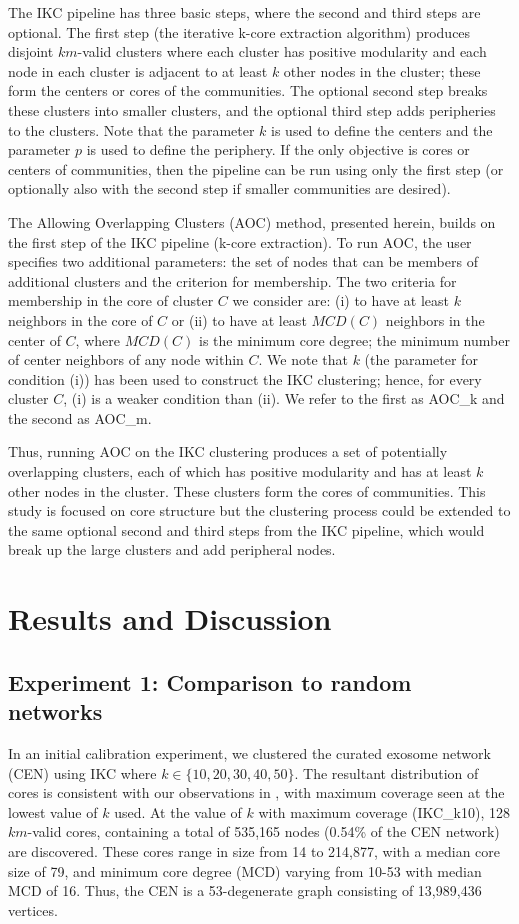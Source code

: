 \documentclass[12pt, oneside]{article}   	%
\begin{document}
The IKC pipeline has three basic steps, where the second and third steps are optional.  The first step (the iterative k-core extraction algorithm) produces disjoint $km$-valid clusters where each cluster has positive modularity and each node in each cluster is adjacent to at least $k$ other nodes in the cluster; these form the centers or cores of the communities. The optional second step breaks these clusters into smaller clusters, and the optional third step adds peripheries to the clusters.  Note that the parameter $k$ is used to define the centers and the parameter $p$ is used to define the periphery. If the only objective is cores or centers of communities, then the pipeline can be run using only the first step (or optionally also with the second step if smaller communities are desired).

The Allowing Overlapping Clusters (AOC) method, presented herein, builds on the first step of the IKC pipeline (k-core extraction). To run AOC, the user specifies two additional parameters:  
the set of nodes that can be members of  additional clusters and the criterion for membership.  The two criteria for membership in the core of cluster $C$ we consider are: (i) to have at least $k$ neighbors 
in the core of $C$ or (ii) to have at least $MCD(C)$ neighbors in the center of $C$, where $MCD(C)$ is the minimum core degree; the minimum number of center neighbors of any node within $C$. 
We note that $k$ (the parameter for condition (i)) has been used to construct the IKC clustering; hence, for every cluster $C$,  (i) is a weaker condition than (ii).
We refer to the first as AOC\_k and the second as AOC\_m.

Thus, running   AOC on the IKC clustering produces a set of potentially overlapping clusters, each of which has positive modularity and has at least $k$ other nodes in the cluster. These clusters form the cores of communities.  This study is focused on core structure but the clustering process could be extended to the same optional second and third steps from the IKC pipeline, which would break up the large clusters and add peripheral nodes. 

\section{Results and Discussion}

\subsection{Experiment 1: Comparison to random networks} In an initial calibration experiment, we clustered the curated exosome network (CEN) using IKC where $k \in {\{10,20,30,40, 50\}}$. The resultant distribution of cores is consistent with our observations in \cite[Figure~3]{Wedell2022}, with maximum coverage seen at the lowest value of $k$ used. At the value of $k$ with maximum coverage (IKC\_k10), 128 $km$-valid cores, containing a total of 535,165 nodes (0.54\% of the CEN network) are discovered. These cores range in size from 14 to 214,877, with a median core size of 79, and minimum core degree (MCD) varying from 10-53 with median MCD of 16. Thus, the CEN is a 53-degenerate graph consisting of 13,989,436 vertices.
\end{document}

